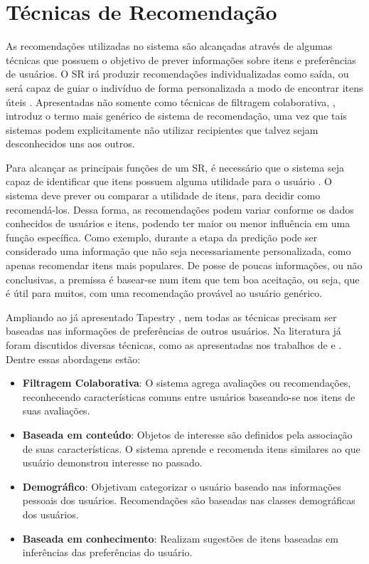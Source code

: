 \section{Técnicas de Recomendação}
\label{sec:tecnicnasRecomendacao}

As recomendações utilizadas no sistema são alcançadas através de algumas técnicas que possuem o objetivo de prever informações sobre itens e preferências de usuários. O SR irá produzir recomendações individualizadas como saída, ou será capaz de guiar o indivíduo de forma personalizada a modo de encontrar itens úteis \citep{Burke:2002:HRS:586321.586352}. Apresentadas não somente como técnicas de filtragem colaborativa, \cite{Resnick:1997:RS:245108.245121}, introduz o termo mais genérico de sistema de recomendação, uma vez que tais sistemas podem explicitamente não utilizar recipientes que talvez sejam desconhecidos uns aos outros. 

Para alcançar as principais funções de um SR, é necessário que o sistema seja capaz de identificar que itens possuem alguma utilidade para o usuário \citep{Ricci2011}. O sistema deve prever ou comparar a utilidade de itens, para decidir como recomendá-los. Dessa forma, as recomendações podem variar conforme os dados conhecidos de usuários e itens, podendo ter maior ou menor influência em uma função específica. Como exemplo, durante a etapa da predição pode ser considerado uma informação que não seja necessariamente personalizada, como apenas recomendar itens mais populares. De posse de poucas informações, ou não conclusivas, a premissa é basear-se num item que tem boa aceitação, ou seja, que é útil para muitos, com uma recomendação provável ao usuário genérico.

Ampliando ao já apresentado Tapestry \citep{Goldberg:1992:UCF:138859.138867}, nem todas as técnicas precisam ser baseadas nas informações de preferências de outros usuários. Na literatura já foram discutidos diversas técnicas, como as apresentadas nos trabalhos de \citep{Ricci2011} e  \citep{ Burke:2002:HRS:586321.586352}. Dentre essas abordagens estão:

\begin{itemize}
	\item{\textbf{Filtragem Colaborativa}: O sistema agrega avaliações ou recomendações, reconhecendo características comuns entre usuários baseando-se nos itens de suas avaliações.}

	\item{\textbf{Baseada em conteúdo}: Objetos de interesse são definidos pela associação de suas características. O sistema aprende e recomenda itens similares ao que usuário demonstrou interesse no passado.}

	\item{\textbf{Demográfico}: Objetivam categorizar o usuário baseado nas informações pessoais dos usuários. Recomendações são baseadas nas classes demográficas dos usuários.}

	\item{\textbf{Baseada em conhecimento}: Realizam sugestões de itens baseadas em inferências das preferências do usuário.}
\end{itemize}

